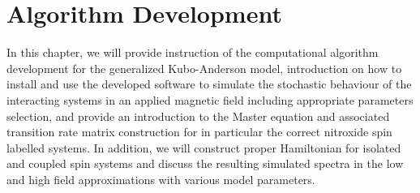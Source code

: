 \section{Algorithm Development}
In this chapter, we will provide instruction of the computational algorithm development for the generalized Kubo-Anderson model, introduction on how to install and use the developed software to simulate the stochastic behaviour of the interacting systems in an applied magnetic field including appropriate parameters selection, and provide an introduction to the Master equation and associated transition rate matrix construction for in particular the correct nitroxide spin labelled systems. In addition, we will construct proper Hamiltonian for isolated and coupled spin systems and discuss the resulting simulated spectra in the low and high field approximations with various model parameters.
